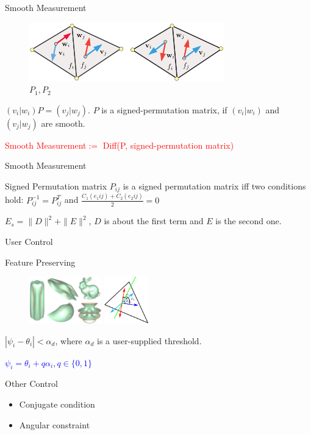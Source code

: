 \documentclass{beamer}
\begin{document}
\begin{frame}{Smooth Measurement}
\begin{figure}[!htb]
\includegraphics[height=1.0in]{./img/P.png}
\caption{$P_1,P_2$}
\end{figure}
$(v_i|w_i)P=(v_j|w_j)$. $P$ is a signed-permutation matrix, if $(v_i|w_i)$ and $(v_j|w_j)$ are smooth.

\textcolor{red}{Smooth Measurement$:=$ Diff(P, signed-permutation matrix)}
\end{frame}

\begin{frame}{Smooth Measurement}
\begin{block}{Signed Permutation matrix}
$P_{ij}$ is a signed permutation matrix iff two conditions hold: $P_{ij}^{-1} = P_{ij}^T$ and $\frac{C_1(e_1{ij})+C_2(e_2{ij})}{2}=0$
\end{block}
$E_s=\|D\|^2+\|E\|^2$, $D$ is about the first term and $E$ is the second one.
\end{frame}

\begin{frame}{User Control}
\begin{block}{Feature Preserving}
\begin{figure}[!htb]
\includegraphics[height=0.8in]{./img/feature.png}\hspace{1.0in}
\includegraphics[height=0.8in]{./img/feature-align.png}
\end{figure}
$|\psi_i-\theta_i|<\alpha_d$, where $\alpha_d$ is a user-supplied threshold.

\textcolor{blue}{$\psi_i=\theta_i+q\alpha_i,q\in\{0,1\}$}
\end{block}
\begin{block}{Other Control}
\begin{itemize}
\item Conjugate condition
\item Angular constraint
\end{itemize}
\end{block}
\end{frame}
\end{document}
